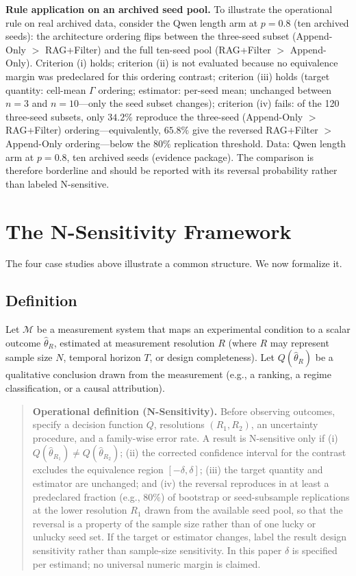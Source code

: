 \documentclass[11pt]{article}
\begin{document}
\textbf{Rule application on an archived seed pool.} To illustrate the operational rule on real archived data, consider the Qwen length arm at $p{=}0.8$ (ten archived seeds): the architecture ordering flips between the three-seed subset (Append-Only $>$ RAG+Filter) and the full ten-seed pool (RAG+Filter $>$ Append-Only). Criterion (i) holds; criterion (ii) is not evaluated because no equivalence margin was predeclared for this ordering contrast; criterion (iii) holds (target quantity: cell-mean $\Gamma$ ordering; estimator: per-seed mean; unchanged between $n{=}3$ and $n{=}10$---only the seed subset changes); criterion (iv) fails: of the 120 three-seed subsets, only $34.2\%$ reproduce the three-seed (Append-Only $>$ RAG+Filter) ordering---equivalently, $65.8\%$ give the reversed RAG+Filter $>$ Append-Only ordering---below the $80\%$ replication threshold. Data: Qwen length arm at $p{=}0.8$, ten archived seeds (evidence package). The comparison is therefore borderline and should be reported with its reversal probability rather than labeled N-sensitive.

\section{The N-Sensitivity Framework}
\label{sec:framework}

The four case studies above illustrate a common structure. We now formalize it.

\subsection{Definition}

Let $\mathcal{M}$ be a measurement system that maps an experimental condition to a scalar outcome $\hat{\theta}_R$, estimated at measurement resolution $R$ (where $R$ may represent sample size $N$, temporal horizon $T$, or design completeness). Let $Q(\hat{\theta}_R)$ be a qualitative conclusion drawn from the measurement (e.g., a ranking, a regime classification, or a causal attribution).

\begin{quote}
\textbf{Operational definition (N-Sensitivity).} Before observing outcomes, specify a decision function $Q$, resolutions $(R_1,R_2)$, an uncertainty procedure, and a family-wise error rate. A result is N-sensitive only if (i) $Q(\hat{\theta}_{R_1}) \neq Q(\hat{\theta}_{R_2})$; (ii) the corrected confidence interval for the contrast excludes the equivalence region $[-\delta,\delta]$; (iii) the target quantity and estimator are unchanged; and (iv) the reversal reproduces in at least a predeclared fraction (e.g., 80\%) of bootstrap or seed-subsample replications at the lower resolution $R_1$ drawn from the available seed pool, so that the reversal is a property of the sample size rather than of one lucky or unlucky seed set. If the target or estimator changes, label the result design sensitivity rather than sample-size sensitivity. In this paper $\delta$ is specified per estimand; no universal numeric margin is claimed.
\end{quote}
\end{document}
